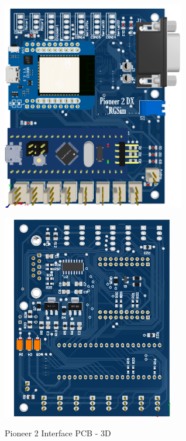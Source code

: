 \documentclass[../../monografia.tex]{subfiles}
\begin{document}
\begin{figure}[h!]
    \centering
    \caption{Pioneer 2 Interface PCB - 3D}
    \begin{minipage}[t]{0.48\textwidth}
        \centering
        \includegraphics[width=8cm]{pcb_1.png}
        \label{fig: Pioneer 2 Interface PCB - Front}
    \end{minipage}
    \hfill
    \begin{minipage}[t]{0.48\textwidth}
        \centering
        \includegraphics[width=7.5cm]{pcb_2.png}
        \label{fig: Pioneer 2 Interface PCB - Back}
    \end{minipage}
    \label{fig: Pioneer 2 Interface PCB - 3D}
\end{figure}
\end{document}
